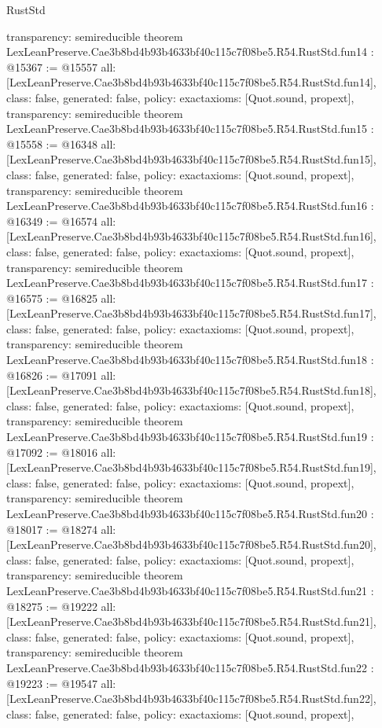 \begin{lexlean}{RustStd}
\begin{coremodule}
{  transparency: semireducible
}
theorem LexLeanPreserve.Cae3b8bd4b93b4633bf40c115c7f08be5.R54.RustStd.fun14 : @15367 := @15557 {
  all: [LexLeanPreserve.Cae3b8bd4b93b4633bf40c115c7f08be5.R54.RustStd.fun14],
  class: false,
  generated: false,
  policy: exact{axioms: [Quot.sound, propext]},
  transparency: semireducible
}
theorem LexLeanPreserve.Cae3b8bd4b93b4633bf40c115c7f08be5.R54.RustStd.fun15 : @15558 := @16348 {
  all: [LexLeanPreserve.Cae3b8bd4b93b4633bf40c115c7f08be5.R54.RustStd.fun15],
  class: false,
  generated: false,
  policy: exact{axioms: [Quot.sound, propext]},
  transparency: semireducible
}
theorem LexLeanPreserve.Cae3b8bd4b93b4633bf40c115c7f08be5.R54.RustStd.fun16 : @16349 := @16574 {
  all: [LexLeanPreserve.Cae3b8bd4b93b4633bf40c115c7f08be5.R54.RustStd.fun16],
  class: false,
  generated: false,
  policy: exact{axioms: [Quot.sound, propext]},
  transparency: semireducible
}
theorem LexLeanPreserve.Cae3b8bd4b93b4633bf40c115c7f08be5.R54.RustStd.fun17 : @16575 := @16825 {
  all: [LexLeanPreserve.Cae3b8bd4b93b4633bf40c115c7f08be5.R54.RustStd.fun17],
  class: false,
  generated: false,
  policy: exact{axioms: [Quot.sound, propext]},
  transparency: semireducible
}
theorem LexLeanPreserve.Cae3b8bd4b93b4633bf40c115c7f08be5.R54.RustStd.fun18 : @16826 := @17091 {
  all: [LexLeanPreserve.Cae3b8bd4b93b4633bf40c115c7f08be5.R54.RustStd.fun18],
  class: false,
  generated: false,
  policy: exact{axioms: [Quot.sound, propext]},
  transparency: semireducible
}
theorem LexLeanPreserve.Cae3b8bd4b93b4633bf40c115c7f08be5.R54.RustStd.fun19 : @17092 := @18016 {
  all: [LexLeanPreserve.Cae3b8bd4b93b4633bf40c115c7f08be5.R54.RustStd.fun19],
  class: false,
  generated: false,
  policy: exact{axioms: [Quot.sound, propext]},
  transparency: semireducible
}
theorem LexLeanPreserve.Cae3b8bd4b93b4633bf40c115c7f08be5.R54.RustStd.fun20 : @18017 := @18274 {
  all: [LexLeanPreserve.Cae3b8bd4b93b4633bf40c115c7f08be5.R54.RustStd.fun20],
  class: false,
  generated: false,
  policy: exact{axioms: [Quot.sound, propext]},
  transparency: semireducible
}
theorem LexLeanPreserve.Cae3b8bd4b93b4633bf40c115c7f08be5.R54.RustStd.fun21 : @18275 := @19222 {
  all: [LexLeanPreserve.Cae3b8bd4b93b4633bf40c115c7f08be5.R54.RustStd.fun21],
  class: false,
  generated: false,
  policy: exact{axioms: [Quot.sound, propext]},
  transparency: semireducible
}
theorem LexLeanPreserve.Cae3b8bd4b93b4633bf40c115c7f08be5.R54.RustStd.fun22 : @19223 := @19547 {
  all: [LexLeanPreserve.Cae3b8bd4b93b4633bf40c115c7f08be5.R54.RustStd.fun22],
  class: false,
  generated: false,
  policy: exact{axioms: [Quot.sound, propext]},
}
\end{coremodule}
\end{lexlean}
